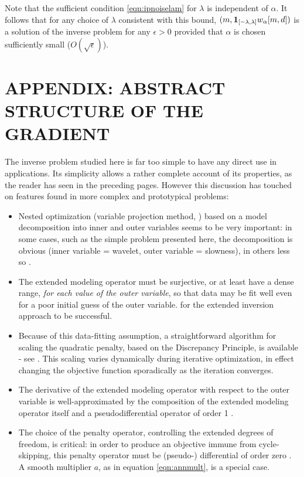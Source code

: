  Note that the sufficient condition \ref{eqn:ipnoiselam} for
$\lambda$ is independent of $\alpha$. It follows that for any choice
of $\lambda$ consistent with this bound, $(m,{\bf
  1}_{[-\lambda,\lambda]}w_{\alpha}[m,d])$ is a solution of the inverse
problem for any $\epsilon > 0$ provided that $\alpha$ is chosen
sufficiently small ($O(\sqrt{\epsilon})$).






\section*{APPENDIX: ABSTRACT STRUCTURE OF THE GRADIENT}

The inverse problem studied here is far too simple to have any direct
use in applications. Its simplicity allows a rather complete account of
its properties, as the reader has seen in the preceding pages. However
this discussion has touched on features found in more complex and
prototypical problems:
\begin{itemize}
\item Nested optimization (variable projection method,
  \cite{GolubPereyra:03}) based on a model decomposition into inner
  and outer variables seems to be very important: in some cases, such
  as the simple problem presented here, the decomposition is obvious
  (inner variable = wavelet, outer variable = slowness), in others
  less so \cite[]{geoprosp:2008,Terentyev:thesis}.
\item The extended modeling operator must be surjective, or at least
  have a dense range, {\em for each value of the outer variable}, so
  that data may be fit well even for a poor initial guess of the outer
  variable. for the extended inversion approach to be successful.
\item Because of this data-fitting assumption, a straightforward
  algorithm for scaling the quadratic penalty, based on the
  Discrepancy Principle, is available - see
  \cite{FuSymes2017discrepancy,Symes:21a,SymesChenMinkoff:21}. This
  scaling varies dynamically during iterative optimization, in effect
  changing the objective function sporadically as the iteration
  converges.
\item The derivative of the extended modeling operator with respect to
  the outer variable is well-approximated by the composition of the
  extended modeling operator itself and a pseudodifferential operator
  of order 1 \cite[]{Symes:IPTA14,tenKroode:IPTA14}.
\item The choice of the penalty operator, controlling the extended
  degrees of freedom, is critical: in order to produce an objective
  immune from cycle-skipping, this penalty operator must be
  (pseudo-) differential of order zero \cite[]{StolkSymes:03}. A smooth
  multiplier $a$, as in equation \ref{eqn:annmult}, is a special case.
\end{itemize}

